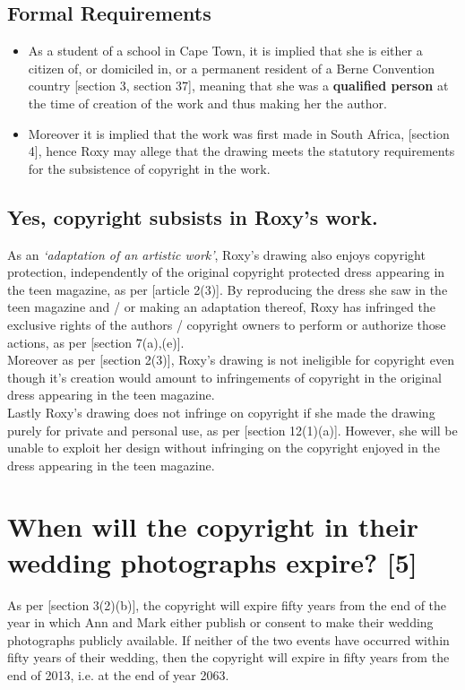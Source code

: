 \documentclass[11pt]{article}
\begin{document}
\subsection{Formal Requirements}
\label{sec:org425b6cc}
\begin{itemize}
\item As a student of a school in Cape Town, it is implied that she is either a
citizen of, or domiciled in, or a permanent resident of a Berne
Convention country [section 3, section 37]\cite{wipo86_berne},
meaning that she was a \textbf{qualified person} at the time of creation
of the work and thus making her the author.
\item Moreover it is implied that the work was first made in South
Africa, [section 4]\cite{rsa78_copyrightact}, hence Roxy may allege
that the drawing meets the statutory requirements for the
subsistence of copyright in the work.
\end{itemize}

\subsection{Yes, copyright subsists in Roxy's work.}
\label{sec:orgb39c1c2}
As an \emph{`adaptation of an artistic work'}, Roxy's drawing also enjoys copyright
protection, independently of the original copyright protected dress appearing in
the teen magazine, as per [article 2(3)]\cite{wipo86_berne}. By reproducing the
dress she saw in the teen magazine and / or making an adaptation thereof, Roxy
has infringed the exclusive rights of the authors / copyright owners to perform or
authorize those actions, as per [section 7(a),(e)]\cite{rsa78_copyrightact}.\\

Moreover as per [section 2(3)]\cite{rsa78_copyrightact}, Roxy's drawing is not
ineligible for copyright even though it's creation would
amount to infringements of copyright in the original dress appearing in the teen
magazine.\\

Lastly Roxy's drawing does not infringe on copyright if she made the drawing
purely for private and personal use, as per [section
12(1)(a)]\cite{rsa78_copyrightact}. However, she will be unable to exploit her
design without infringing on the copyright enjoyed in the dress appearing in the
teen magazine.

\section{When will the copyright in their wedding photographs expire? [5]}
\label{sec:org6093da4}
As per [section 3(2)(b)]\cite{rsa78_copyrightact}, the copyright will expire fifty
years from the end of the year in which Ann and Mark either publish or consent
to make their wedding photographs publicly available. If neither of the two
events have occurred within fifty years of their wedding, then the copyright
will expire in fifty years from the end of 2013, i.e. at the end of year 2063.
\end{document}
